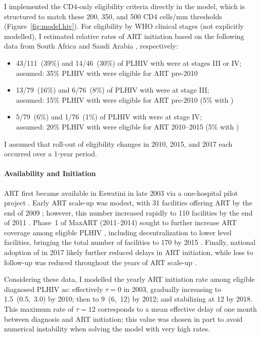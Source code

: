 \par
I implemented the CD4-only eligibility criteria directly in the model,
which is structured to match these 200, 350, and 500 CD4 cells/mm thresholds
(Figure~\ref{fig:model.hiv}).
For eligibility by WHO clinical stages (not explicitly modelled),
I estimated relative rates of ART initiation based on the following data from
South Africa \cite[Table~4]{Badri2004} and Saudi Arabia \cite[Table~2]{Edathodu2009}, respectively:
\begin{itemize}
  \item 43/111~(39\%) and 14/46~(30\%) of PLHIV with  were at stages III or IV;\\
        assumed: 35\% PLHIV with  were eligible for ART pre-2010
  \item 13/79~(16\%) and 6/76~(8\%) of PLHIV with  were at stage III;\\
        assumed: 15\% PLHIV with  were eligible for ART pre-2010
        (5\% with )
  \item 5/79~(6\%) and 1/76~(1\%) of PLHIV with  were at stage IV;\\
        assumed: 20\% PLHIV with  were eligible for ART 2010--2015
        (5\% with )
\end{itemize}
I assumed that roll-out of eligibility changes in 2010, 2015, and 2017
each occurred over a 1-year period.
\paragraph{Availability and Initiation}
ART first became available in Eswatini in late 2003
via a one-hospital pilot project \cite{NERCHA2012}.
Early ART scale-up was modest, with 31 facilities offering ART by the end of 2009 \cite{CDC2013ART};
however, this number increased rapidly
to 110 facilities by the end of 2011 \cite{NERCHA2012}.
Phase~1 of MaxART (2011--2014) sought to
further increase ART coverage among eligible PLHIV \cite{MaxART1},
including decentralization to lower level facilities,
bringing the total number of facilities to 170 by 2015 \cite{EswMOH2015a}.
Finally, national adoption of  in 2017
likely further reduced delays in ART initiation,
while loss to follow-up was reduced throughout the years of ART scale-up \cite{MaxART2}.
\par
Considering these data, I modelled the yearly ART initiation rate among eligible diagnosed PLHIV as:
effectively $\tau = 0$ in 2003, gradually increasing to 1.5~(0.5,~3.0) by 2010;
then to 9~(6,~12) by 2012; and stabilizing at 12 by 2018.
This maximum rate of $\tau = 12$ corresponds to
a mean effective delay of one month between diagnosis and ART initiation;
this value was chosen in part to avoid numerical instability
when solving the model with very high rates.
